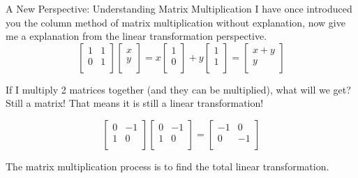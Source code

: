 \documentclass{beamer}
\begin{document}
\begin{frame}{A New Perspective: Understanding Matrix Multiplication}
I have once introduced you the column method of matrix multiplication without explanation, now give me a explanation from the linear transformation perspective.
\begin{equation*}
    \left[ \begin{matrix}
        1&		1\\
        0&		1\\
    \end{matrix} \right] \left[ \begin{array}{c}
        x\\
        y\\
    \end{array} \right] =x\left[ \begin{array}{c}
        1\\
        0\\
    \end{array} \right] +y\left[ \begin{array}{c}
        1\\
        1\\
    \end{array} \right] =\left[ \begin{array}{c}
        x+y\\
        y\\
    \end{array} \right]
\end{equation*}


If I multiply 2 matrices together (and they can be multiplied), what will we get? Still a matrix! That means it is still a linear transformation!

\begin{equation*}
    \left[ \begin{matrix}
        0&		-1\\
        1&		0\\
    \end{matrix} \right] \left[ \begin{matrix}
        0&		-1\\
        1&		0\\
    \end{matrix} \right] =\left[ \begin{matrix}
        -1&		0\\
        0&		-1\\
    \end{matrix} \right]
\end{equation*}

\vspace{3pt}
The matrix multiplication process is to find the total linear transformation.
\end{frame}
\end{document}
